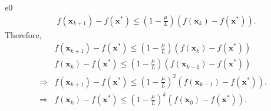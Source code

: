 \documentclass{article}
\newcommand{\xB}{\bm{x}}
\begin{document}
\begin{PROOF}{e0}
\[\begin{aligned}
	&f(\xB_{k+1}) - f(\xB^*) \leq (1 - \frac{\mu}{L}) (f(\xB_k) - f(\xB^*)).
	\end{aligned}
	\]
	Therefore,
	\[
	\begin{aligned}
	&f(\xB_{k+1}) - f(\xB^*) \leq (1 - \frac{\mu}{L}) (f(\xB_k) - f(\xB^*)) \\
	&f(\xB_k) - f(\xB^*) \leq (1 - \frac{\mu}{L}) (f(\xB_{k-1}) - f(\xB^*)) \\
	\Rightarrow &f(\xB_{k+1}) - f(\xB^*) \leq (1 - \frac{\mu}{L})^{2} (f(\xB_{k-1}) - f(\xB^*)).\\
	\Rightarrow &f(\xB_{k}) - f(\xB^*) \leq (1 - \frac{\mu}{L})^k (f(\xB_0) - f(\xB^*)).
	\end{aligned}
	\]
	
	
	
	
\end{PROOF}
\end{document}
